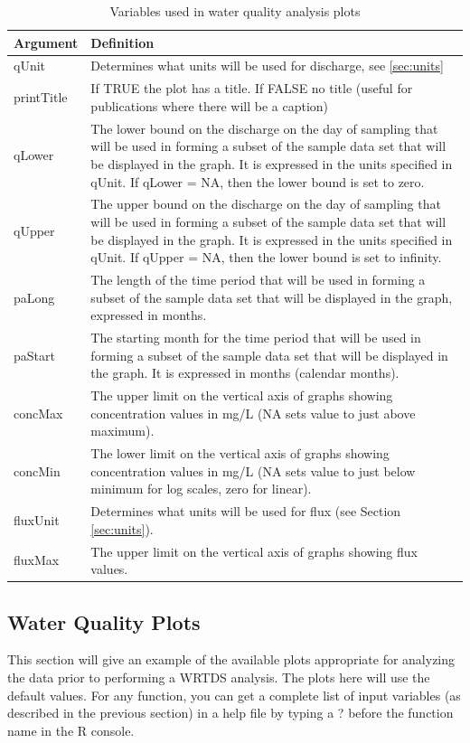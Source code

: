 \documentclass[a4paper,11pt]{article}
\begin{document}
\begin{table}
\caption{Variables used in water quality analysis plots  \label{tab:wqVariables}}
\begin{tabularx}{\textwidth}{lX}
\hline
  \textbf{Argument} & \textbf{Definition} \\
\hline
qUnit & Determines what units will be used for discharge, see \ref{sec:units}\\
printTitle & If TRUE the plot has a title.  If FALSE no title (useful for publications where there will be a caption)\\
qLower & The lower bound on the discharge on the day of sampling that will be used in forming a subset of the sample data set that will be displayed in the graph.  It is expressed in the units specified in qUnit.  If qLower = NA, then the lower bound is set to zero.\\
qUpper & The upper bound on the discharge on the day of sampling that will be used in forming a subset of the sample data set that will be displayed in the graph.  It is expressed in the units specified in qUnit.  If qUpper = NA, then the lower bound is set to infinity.\\
paLong & The length of the time period that will be used in forming a subset of the sample data set that will be displayed in the graph, expressed in months. \\ 
paStart & The starting month for the time period that will be used in forming a subset of the sample data set that will be displayed in the graph.  It is expressed in months (calendar months).\\
concMax & The upper limit on the vertical axis of graphs showing concentration values in mg/L (NA sets value to just above maximum).  \\
concMin & The lower limit on the vertical axis of graphs showing concentration values in mg/L (NA sets value to just below minimum for log scales, zero for linear).  \\
fluxUnit & Determines what units will be used for flux (see Section \ref{sec:units}).\\
fluxMax & The upper limit on the vertical axis of graphs showing flux values.  \\
\hline
\end{tabularx}

\end{table}

\subsection{Water Quality Plots}
\label{sec:wqPlots}
This section will give an example of the available plots appropriate for analyzing the data prior to performing a WRTDS analysis. The plots here will use the default values.  For any function, you can get a complete list of input variables (as described in the previous section) in a help file by typing a ? before the function name in the R console. 
\end{document}

